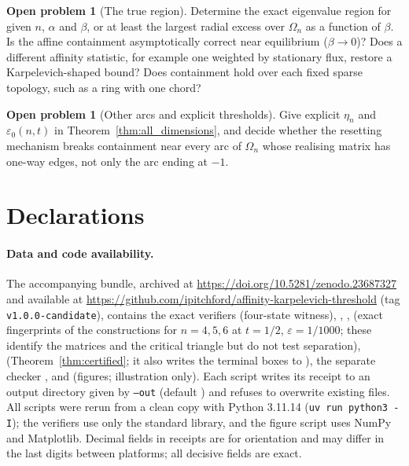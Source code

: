 \documentclass[11pt,a4paper]{article}
\numberwithin{equation}{section}
\theoremstyle{definition}
\newtheorem{problem}[theorem]{Open problem}
\theoremstyle{remark}
\newcommand{\Om}{\Omega}
\newcommand{\eps}{\varepsilon}
\begin{document}
\begin{problem}[The true region]
Determine the exact eigenvalue region for given \(n\), \(\alpha\) and
\(\beta\), or at least the largest radial excess over \(\Om_n\) as a
function of \(\beta\). Is the affine containment asymptotically correct
near equilibrium (\(\beta\to0\))? Does a different affinity statistic,
for example one weighted by stationary flux, restore a Karpelevich-shaped
bound? Does containment hold over each fixed sparse topology, such as a
ring with one chord?
\end{problem}

\begin{problem}[Other arcs and explicit thresholds]
Give explicit \(\eta_n\) and \(\eps_0(n,t)\) in
Theorem~\ref{thm:all_dimensions}, and decide whether the resetting
mechanism breaks containment near every arc of \(\Om_n\) whose
realising matrix has one-way edges, not only the arc ending at \(-1\).
\end{problem}

\section*{Declarations}

\paragraph{Data and code availability.} The accompanying bundle, archived at \url{https://doi.org/10.5281/zenodo.23687327} and available at \url{https://github.com/ipitchford/affinity-karpelevich-threshold} (tag \texttt{v1.0.0-candidate}),
contains the exact verifiers 
(four-state witness), ,
, 
(exact fingerprints of the constructions for \(n=4,5,6\) at
\(t=1/2\), \(\eps=1/1000\); these identify the matrices and the
critical triangle but do not test separation),
 (Theorem~\ref{thm:certified};
it also writes the terminal boxes to ),
the separate checker , and
 (figures; illustration only). Each script
writes its receipt to an output directory given by \texttt{--out}
(default ) and refuses to overwrite existing files.
All scripts were rerun from a clean copy with Python 3.11.14
(\texttt{uv run python3 -I}); the verifiers use only the standard
library, and the figure script uses NumPy and Matplotlib. Decimal
fields in receipts are for orientation and may differ in the last
digits between platforms; all decisive fields are exact.
\end{document}
